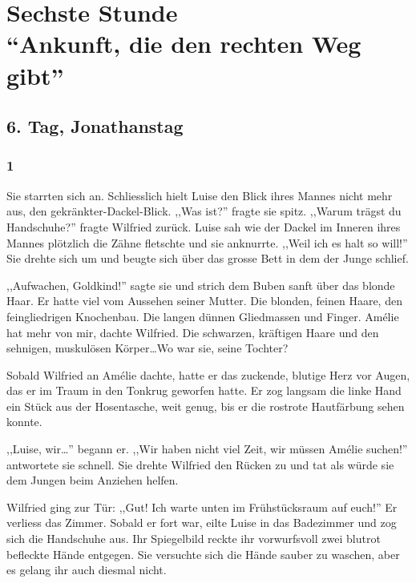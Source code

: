  \part*{Sechste Stunde\\"`Ankunft, die den rechten Weg gibt"'}

\chapter*{6. Tag, Jonathanstag}

\section*{1}

Sie starrten sich an. Schliesslich hielt Luise den Blick ihres Mannes nicht mehr aus, den gekränkter-Dackel-Blick. ,,Was ist?'' fragte sie spitz. ,,Warum trägst du Handschuhe?'' fragte Wilfried zurück. Luise sah wie der Dackel im Inneren ihres Mannes  plötzlich die Zähne fletschte und sie anknurrte. ,,Weil ich es halt so will!'' Sie drehte sich um und beugte sich über das grosse Bett in dem der Junge schlief. 

,,Aufwachen, Goldkind!'' sagte sie und strich dem Buben sanft über das blonde Haar. Er hatte viel vom Aussehen seiner Mutter. Die blonden, feinen Haare, den feingliedrigen Knochenbau. Die langen dünnen Gliedmassen und Finger. Amélie hat mehr von mir, dachte Wilfried. Die schwarzen, kräftigen Haare und den sehnigen, muskulösen Körper\dots Wo war sie, seine Tochter? 

Sobald Wilfried an Amélie dachte, hatte er das zuckende, blutige Herz vor Augen, das er im Traum in den Tonkrug geworfen hatte. Er zog langsam die linke Hand ein Stück aus der Hosentasche, weit genug, bis er die rostrote Hautfärbung sehen konnte.

,,Luise, wir\dots '' begann er. ,,Wir haben nicht viel Zeit, wir müssen Amélie suchen!'' antwortete sie schnell. Sie drehte Wilfried den Rücken zu und tat als würde sie dem Jungen beim Anziehen helfen. 

Wilfried ging zur Tür: ,,Gut! Ich warte unten im Frühstücksraum auf euch!'' Er verliess das Zimmer. Sobald er fort war, eilte Luise in das Badezimmer und zog sich die Handschuhe aus. Ihr Spiegelbild reckte ihr vorwurfsvoll zwei blutrot befleckte Hände entgegen. Sie versuchte sich die Hände sauber zu waschen, aber es gelang ihr auch diesmal nicht. 

